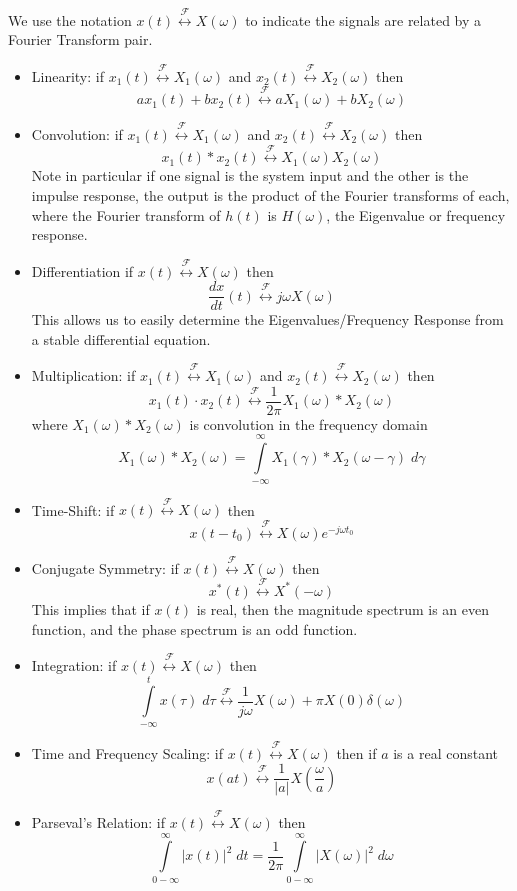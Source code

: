 We use the notation $x(t) \stackrel{\mathcal{F}}{\longleftrightarrow} X(\omega)$ to indicate the signals are related by a Fourier Transform pair.
\begin{itemize}
\item Linearity: if $x_1(t) \stackrel{\mathcal{F}}{\longleftrightarrow} X_1(\omega)$ and $x_2(t) \stackrel{\mathcal{F}}{\longleftrightarrow} X_2(\omega)$ then
  \[
  ax_1(t) + bx_2(t) \stackrel{\mathcal{F}}{\longleftrightarrow} aX_1(\omega) + bX_2(\omega)
  \]
\item Convolution: if $x_1(t) \stackrel{\mathcal{F}}{\longleftrightarrow} X_1(\omega)$ and $x_2(t) \stackrel{\mathcal{F}}{\longleftrightarrow} X_2(\omega)$ then
  \[
  x_1(t) * x_2(t) \stackrel{\mathcal{F}}{\longleftrightarrow} X_1(\omega)X_2(\omega)
  \]
  Note in particular if one signal is the system input and the other is the impulse response, the output is the product of the Fourier transforms of each, where the Fourier transform of $h(t)$ is $H(\omega)$, the Eigenvalue or frequency response.
\item Differentiation if $x(t) \stackrel{\mathcal{F}}{\longleftrightarrow} X(\omega)$ then
  \[
  \frac{dx}{dt}(t) \stackrel{\mathcal{F}}{\longleftrightarrow} j\omega X(\omega)
  \]
  This allows us to easily determine the Eigenvalues/Frequency Response from a stable differential equation.
\item Multiplication: if $x_1(t) \stackrel{\mathcal{F}}{\longleftrightarrow} X_1(\omega)$ and $x_2(t) \stackrel{\mathcal{F}}{\longleftrightarrow} X_2(\omega)$ then
  \[
  x_1(t) \cdot x_2(t) \stackrel{\mathcal{F}}{\longleftrightarrow} \frac{1}{2\pi} X_1(\omega)*X_2(\omega)
  \]
  where $X_1(\omega)*X_2(\omega)$ is convolution in the frequency domain
  \[
  X_1(\omega)*X_2(\omega) = \int\limits_{-\infty}^{\infty} X_1(\gamma)*X_2(\omega-\gamma)\;d\gamma 
  \]
\item Time-Shift: if $x(t) \stackrel{\mathcal{F}}{\longleftrightarrow} X(\omega)$ then
  \[
  x(t-t_0) \stackrel{\mathcal{F}}{\longleftrightarrow} X(\omega)e^{-j\omega t_0}
  \]
\item Conjugate Symmetry: if $x(t) \stackrel{\mathcal{F}}{\longleftrightarrow} X(\omega)$ then
  \[
  x^*(t) \stackrel{\mathcal{F}}{\longleftrightarrow} X^*(-\omega)
  \]
  This implies that if $x(t)$ is real, then the magnitude spectrum is an even function, and the phase spectrum is an odd function.

\item Integration: if $x(t) \stackrel{\mathcal{F}}{\longleftrightarrow} X(\omega)$ then
  \[
  \int\limits_{-\infty}^t x(\tau)\; d\tau \stackrel{\mathcal{F}}{\longleftrightarrow} \frac{1}{j\omega} X(\omega) + \pi X(0) \delta(\omega)
  \]
\item Time and Frequency Scaling: if $x(t) \stackrel{\mathcal{F}}{\longleftrightarrow} X(\omega)$ then if $a$ is a real constant
  \[
  x(at) \stackrel{\mathcal{F}}{\longleftrightarrow} \frac{1}{|a|} X\left(\frac{\omega}{a}\right)
  \]
\item Parseval's Relation: if $x(t) \stackrel{\mathcal{F}}{\longleftrightarrow} X(\omega)$ then
  \[
  \int\limits_{0-\infty}^{\infty} |x(t)|^2\; dt =  \frac{1}{2\pi}\int\limits_{0-\infty}^{\infty} |X(\omega)|^2\;d\omega
  \]
\end{itemize}


